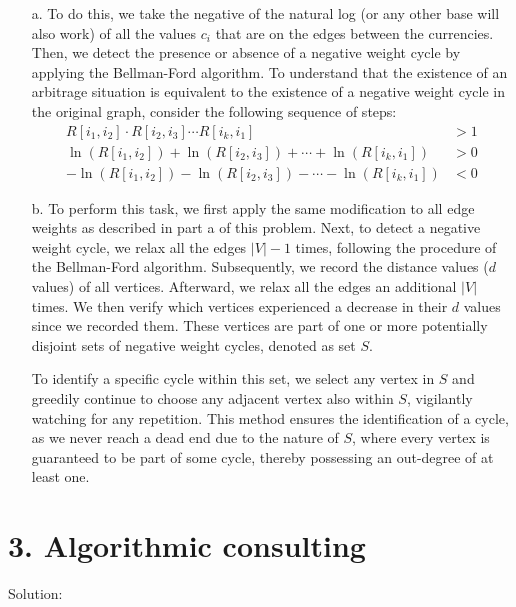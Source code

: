 \documentclass{article}
\begin{document}
\begin{enumerate}
    \item[a.]  To do this, we take the negative of the natural log (or any other base will also work) of all the values $c_i$ that are on the edges between the currencies. Then, we detect the presence or absence of a negative weight cycle by applying the Bellman-Ford algorithm. To understand that the existence of an arbitrage situation is equivalent to the existence of a negative weight cycle in the original graph, consider the following sequence of steps:
    \begin{align*}
        R[i_1, i_2] \cdot R[i_2, i_3] \cdots R[i_k, i_1] &> 1 \\
        \ln(R[i_1, i_2]) + \ln(R[i_2, i_3]) + \cdots + \ln(R[i_k, i_1]) &> 0 \\
        - \ln(R[i_1, i_2]) - \ln(R[i_2, i_3]) - \cdots - \ln(R[i_k, i_1]) &< 0
    \end{align*}

    
    \item[b.] To perform this task, we first apply the same modification to all edge weights as described in part a of this problem. Next, to detect a negative weight cycle, we relax all the edges $|V| - 1$ times, following the procedure of the Bellman-Ford algorithm. Subsequently, we record the distance values ($d$ values) of all vertices. Afterward, we relax all the edges an additional $|V|$ times. We then verify which vertices experienced a decrease in their $d$ values since we recorded them. These vertices are part of one or more potentially disjoint sets of negative weight cycles, denoted as set $S$. 

    To identify a specific cycle within this set, we select any vertex in $S$ and greedily continue to choose any adjacent vertex also within $S$, vigilantly watching for any repetition. This method ensures the identification of a cycle, as we never reach a dead end due to the nature of $S$, where every vertex is guaranteed to be part of some cycle, thereby possessing an out-degree of at least one.

\end{enumerate}

\section*{3. Algorithmic consulting}
Solution:
\end{document}
